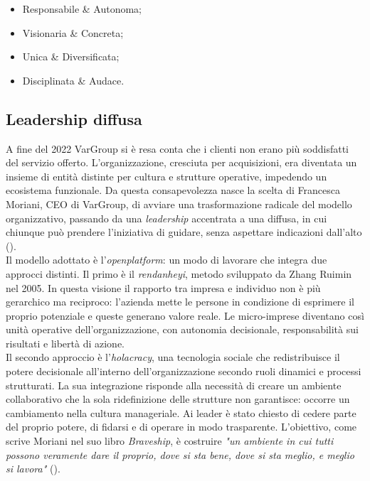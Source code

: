 \begin{itemize}
    \item Responsabile \& Autonoma;
    \item Visionaria \& Concreta;
    \item Unica \& Diversificata;
    \item Disciplinata \& Audace.
\end{itemize}

\subsection{Leadership diffusa}

A fine del 2022 VarGroup si è resa conta che i clienti non erano più soddisfatti del servizio offerto. L'organizzazione, cresciuta per acquisizioni, era diventata un insieme di entità distinte per cultura e strutture operative, impedendo un ecosistema funzionale. Da questa consapevolezza nasce la scelta di Francesca Moriani, CEO di VarGroup, di avviare una trasformazione radicale del modello organizzativo, passando da una \emph{leadership} accentrata a una diffusa, in cui chiunque può prendere l'iniziativa di guidare, senza aspettare indicazioni dall'alto (\cite{site:industriaitaliana_vargroup}).\\

Il modello adottato è l'\emph{\gls{openplatform}}\glsfirstoccur: un modo di lavorare che integra due approcci distinti. Il primo è il \emph{\gls{rendanheyi}}\glsfirstoccur, metodo sviluppato da Zhang Ruimin nel 2005. In questa visione il rapporto tra impresa e individuo non è più gerarchico ma reciproco: l'azienda mette le persone in condizione di esprimere il proprio potenziale e queste generano valore reale. Le micro-imprese diventano così unità operative dell'organizzazione, con autonomia decisionale, responsabilità sui risultati e libertà di azione.\\

Il secondo approccio è l'\emph{\gls{holacracy}}\glsfirstoccur, una tecnologia sociale che redistribuisce il potere decisionale all'interno dell'organizzazione secondo ruoli dinamici e processi strutturati. La sua integrazione risponde alla necessità di creare un ambiente collaborativo che la sola ridefinizione delle strutture non garantisce: occorre un cambiamento nella cultura manageriale. Ai leader è stato chiesto di cedere parte del proprio potere, di fidarsi e di operare in modo trasparente. L'obiettivo, come scrive Moriani nel suo libro \emph{Braveship}, è costruire \emph{"un ambiente in cui tutti possono veramente dare il proprio, dove si sta bene, dove si sta meglio, e meglio si lavora"} (\cite[p. 158]{book:moriani_braveship}).\\

